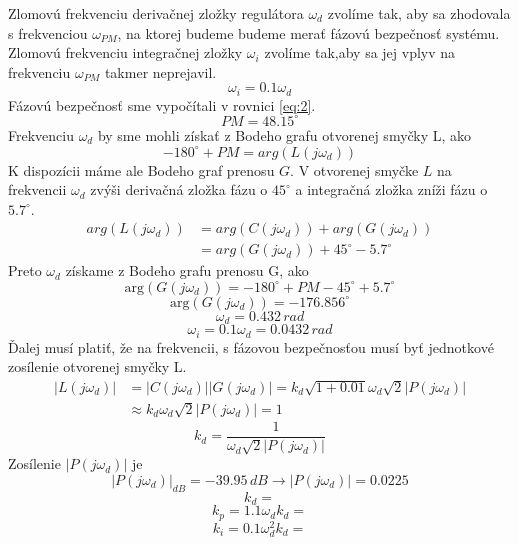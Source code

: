 \documentclass[journal]{IEEEtran}
\begin{document}
Zlomovú frekvenciu derivačnej zložky regulátora $\omega_d$ zvolíme tak, aby sa zhodovala s frekvenciou $\omega_{PM}$, na ktorej budeme budeme merať fázovú bezpečnosť systému. Zlomovú frekvenciu integračnej zložky $\omega_i$ zvolíme tak,aby sa jej vplyv na frekvenciu $\omega_{PM}$ takmer neprejavil. 
\begin{equation}
\omega_{i}=0.1\omega_{d}
\end{equation}
Fázovú bezpečnosť sme vypočítali v rovnici \ref{eq:2}.
\begin{equation}
PM=48.15^\circ
\end{equation}
Frekvenciu $\omega_d$ by sme mohli získať z Bodeho grafu otvorenej smyčky L, ako
\begin{equation}
-180^\circ+PM=arg(L(j \omega_d))
\end{equation}
K dispozícii máme ale Bodeho graf prenosu $G$. V otvorenej smyčke $L$ na frekvencii $\omega_d$ zvýši derivačná zložka fázu o $45^\circ$ a integračná zložka zníži fázu o $5.7^\circ$.
\begin{align}
arg(L(j\omega_d))&=arg(C(j\omega_d))+arg(G(j\omega_d))\nonumber\\
&=arg(G(j\omega_d))+45^\circ-5.7^\circ
\end{align}
Preto $\omega_d$ získame z Bodeho grafu prenosu G, ako
\begin{equation}
\mathrm{arg}(G(j\omega_d))=-180^\circ + PM -45^\circ +5.7^\circ
\end{equation} 
\begin{equation}
\mathrm{arg}(G(j\omega_d))=-176.856^\circ
\end{equation} 
\begin{equation}
\omega_d = 0.432\, rad
\end{equation} 
\begin{equation}
\omega_i =0.1\omega_d= 0.0432\, rad
\end{equation} 
Ďalej musí platiť, že na frekvencii, s fázovou bezpečnosťou musí byť jednotkové zosílenie otvorenej smyčky L.
\begin{align}
|L(j\omega_d)|&=|C(j\omega_d)||G(j\omega_d)|=k_d\sqrt{1+0.01}\omega_{d}\sqrt{2}|P(j\omega_{d})|\nonumber\\
&\approx k_d\omega_{d}\sqrt{2}|P(j\omega_{d})|=1
\end{align} 
\begin{equation}
k_d=\frac{1}{\omega_d\sqrt{2}|P(j\omega_d)|}
\end{equation}
Zosílenie $|P(j\omega_d)|$ je
\begin{equation}
|P(j\omega_d)|_{dB}=-39.95\,dB \rightarrow |P(j\omega_d)|=0.0225 
\end{equation}
\begin{equation}
k_d=
\end{equation}
\begin{equation}
k_p=1.1\omega_{d}k_d=
\end{equation}
\begin{equation}
k_i=0.1\omega_{d}^2k_d=
\end{equation}
\end{document}
